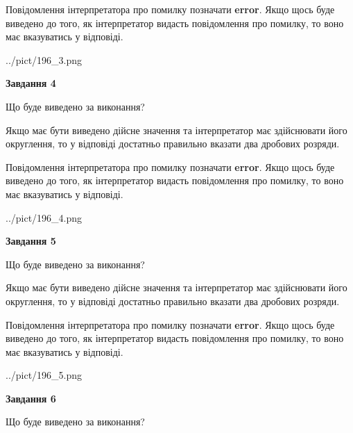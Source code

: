 \documentclass[12pt, ukrainian]{article}
\begin{document}
{\begin {Large}
Повідомлення інтерпретатора про помилку позначати \textbf{error}.
Якщо щось буде виведено до того, як інтерпретатор видасть повідомлення про помилку, 
то воно має вказуватись у відповіді. \par

\begin{center}
	{../pict/196_3.png}
\end{center}
\newpage

{\begin {center}\textbf{Завдання 4}\end {center}}\par
Що буде виведено за виконання? \par

Якщо має бути виведено дійсне значення та інтерпретатор має здійснювати його округлення, 
то у відповіді достатньо правильно вказати два дробових розряди.

Повідомлення інтерпретатора про помилку позначати \textbf{error}.
Якщо щось буде виведено до того, як інтерпретатор видасть повідомлення про помилку, 
то воно має вказуватись у відповіді. \par

\begin{center}
	{../pict/196_4.png}
\end{center}
\newpage

{\begin {center}\textbf{Завдання 5}\end {center}}\par
Що буде виведено за виконання? \par

Якщо має бути виведено дійсне значення та інтерпретатор має здійснювати його округлення, 
то у відповіді достатньо правильно вказати два дробових розряди.

Повідомлення інтерпретатора про помилку позначати \textbf{error}.
Якщо щось буде виведено до того, як інтерпретатор видасть повідомлення про помилку, 
то воно має вказуватись у відповіді. \par

\begin{center}
	{../pict/196_5.png}
\end{center}
\newpage

{\begin {center}\textbf{Завдання 6}\end {center}}\par
Що буде виведено за виконання? \par


\end{Large}}
\end{document}
